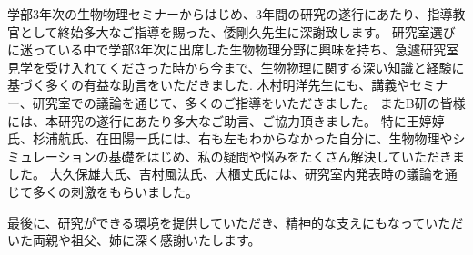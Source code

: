 学部3年次の生物物理セミナーからはじめ、3年間の研究の遂行にあたり、指導教官として終始多大なご指導を賜った、倭剛久先生に深謝致します。
研究室選びに迷っている中で学部3年次に出席した生物物理分野に興味を持ち、急遽研究室見学を受け入れてくださった時から今まで、生物物理に関する深い知識と経験に基づく多くの有益な助言をいただきました. 
木村明洋先生にも、講義やセミナー、研究室での議論を通じて、多くのご指導をいただきました。
またB研の皆様には、本研究の遂行にあたり多大なご助言、ご協力頂きました。
特に王婷婷氏、杉浦航氏、在田陽一氏には、右も左もわからなかった自分に、生物物理やシミュレーションの基礎をはじめ、私の疑問や悩みをたくさん解決していただきました。
大久保雄大氏、吉村風汰氏、大櫃丈氏には、研究室内発表時の議論を通じて多くの刺激をもらいました。

最後に、研究ができる環境を提供していただき、精神的な支えにもなっていただいた両親や祖父、姉に深く感謝いたします。